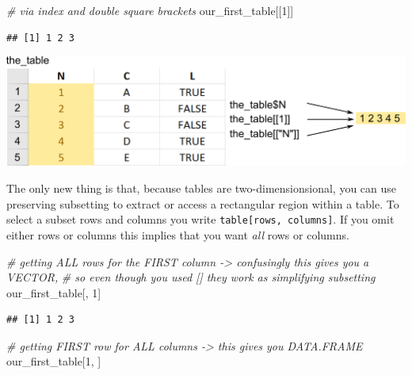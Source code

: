 \documentclass[
]{book}
\newenvironment{Shaded}{\begin{snugshade}}{\end{snugshade}}
\newcommand{\CommentTok}[1]{\textcolor[rgb]{0.56,0.35,0.01}{\textit{#1}}}
\newcommand{\DecValTok}[1]{\textcolor[rgb]{0.00,0.00,0.81}{#1}}
\newcommand{\NormalTok}[1]{#1}
\begin{document}
\begin{Shaded}
\begin{Highlighting}[]
\CommentTok{\# via index and double square brackets}
\NormalTok{our\_first\_table[[}\DecValTok{1}\NormalTok{]]}
\end{Highlighting}
\end{Shaded}

\begin{verbatim}
## [1] 1 2 3
\end{verbatim}

\begin{center}\includegraphics[width=1\linewidth]{images/table-column} \end{center}

The only new thing is that, because tables are two-dimensionsional, you can use preserving subsetting to extract or access a rectangular region within a table. To select a subset rows and columns you write \texttt{table{[}rows,\ columns{]}}. If you omit either rows or columns this implies that you want \emph{all} rows or columns.

\begin{Shaded}
\begin{Highlighting}[]
\CommentTok{\# getting ALL rows for the FIRST column {-}\textgreater{} confusingly this gives you a VECTOR, }
\CommentTok{\# so even though you used [] they work as simplifying subsetting}
\NormalTok{our\_first\_table[, }\DecValTok{1}\NormalTok{]}
\end{Highlighting}
\end{Shaded}

\begin{verbatim}
## [1] 1 2 3
\end{verbatim}

\begin{Shaded}
\begin{Highlighting}[]
\CommentTok{\# getting FIRST row for ALL columns {-}\textgreater{} this gives you DATA.FRAME}
\NormalTok{our\_first\_table[}\DecValTok{1}\NormalTok{, ]}
\end{Highlighting}
\end{Shaded}
\end{document}
